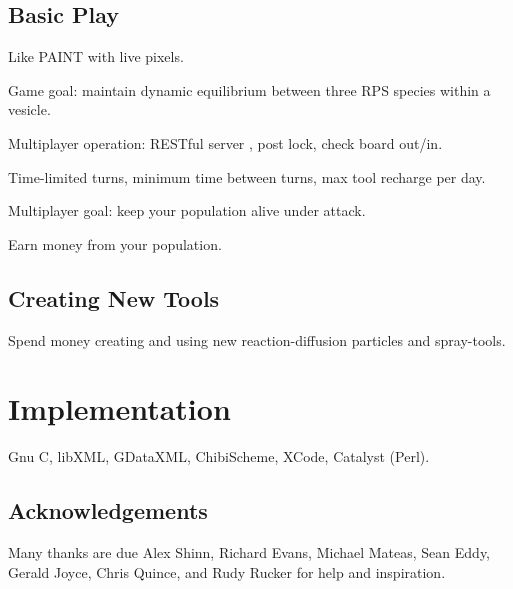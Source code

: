 \documentclass{acm_proc_article-sp}
\begin{document}
\subsection{Basic Play}

Like PAINT with live pixels.

Game goal: maintain dynamic equilibrium between three RPS species within a vesicle.

Multiplayer operation: RESTful server \cite{RESTthesis}, post lock, check board out/in.

Time-limited turns, minimum time between turns, max tool recharge per day.

Multiplayer goal: keep your population alive under attack.

Earn money from your population.

\subsection{Creating New Tools}

Spend money creating and using new reaction-diffusion particles and spray-tools.

\section{Implementation}

Gnu C, libXML, GDataXML, ChibiScheme, XCode, Catalyst (Perl).

\subsection{Acknowledgements}

Many thanks are due Alex Shinn, Richard Evans, Michael Mateas, Sean Eddy, Gerald Joyce, Chris Quince,
and Rudy Rucker for help and inspiration.




\balancecolumns
\end{document}
